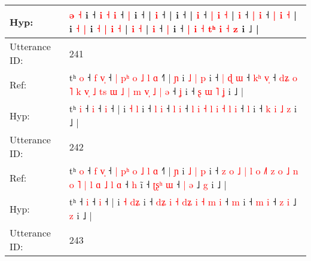 \documentclass[10pt]{article}
\DeclareRobustCommand{\hl}[1]{{\textcolor{red}{#1}}}
\begin{document}
\begin{longtable}{ll}
 \\
Hyp: & \hl{ə}\hl{ }\hl{˧} i ˧ \hl{i} \hl{˧} \hl{i} ˧\hl{}\hl{} \hl{}\hl{|} i ˧ |\hl{}\hl{} \hl{i} ˧ |\hl{}\hl{}\hl{} i ˧ |\hl{}\hl{} \hl{i} ˧ \hl{|} \hl{i} \hl{˧} |\hl{}\hl{} \hl{i} ˧ \hl{|} \hl{i} ˧ \hl{|} \hl{i} \hl{˧} |\hl{}\hl{}\hl{} i \hl{˧} \hl{}\hl{|} i \hl{˧} \hl{}\hl{|} \hl{}\hl{i} \hl{}\hl{˧} |\hl{}\hl{}\hl{} \hl{i} \hl{˧} | \hl{i} ˧ \hl{|} i ˧ \hl{|} \hl{i} \hl{˧} \hl{}\hl{t}\hl{ʰ} \hl{i} \hl{˧} \hl{}\hl{z} i ˩\hl{} |
 \\
\midrule
Utterance ID: & 241 \\
Ref: & tʰ \hl{o} ˧\hl{ }\hl{f} \hl{v}\hl{̩} ˧\hl{ }\hl{|}\hl{ }\hl{p}\hl{ʰ}\hl{ }\hl{o}\hl{ }\hl{˩}\hl{ }\hl{l} \hl{ɑ} ˧\hl{˥} |\hl{ }\hl{ɲ} i\hl{ }\hl{˩} \hl{|} \hl{p} i ˧\hl{ }\hl{|} \hl{ɖ} \hl{ɯ} ˧ \hl{k}\hl{ʰ} \hl{v}\hl{̩} ˧\hl{ }\hl{d}\hl{ʑ}\hl{ }\hl{o}\hl{ }\hl{˥}\hl{ }\hl{k}\hl{ }\hl{v}\hl{̩}\hl{ }\hl{˩}\hl{ }\hl{t}\hl{s} \hl{ɯ} \hl{˩} \hl{|} \hl{m} \hl{v}\hl{̩} \hl{˩} \hl{|} \hl{ə} ˧ \hl{ʝ} i ˧ \hl{ʂ} \hl{ɯ} \hl{˥} \hl{ʝ} i ˩ |
 \\
Hyp: & tʰ \hl{i} ˧\hl{}\hl{} \hl{}\hl{i} ˧\hl{}\hl{}\hl{}\hl{}\hl{}\hl{}\hl{}\hl{}\hl{}\hl{}\hl{} \hl{i} ˧\hl{} |\hl{}\hl{} i\hl{}\hl{} \hl{˧} \hl{l} i ˧\hl{}\hl{} \hl{l} \hl{i} ˧ \hl{}\hl{l} \hl{}\hl{i} ˧\hl{}\hl{}\hl{}\hl{}\hl{}\hl{}\hl{}\hl{}\hl{}\hl{}\hl{}\hl{}\hl{}\hl{}\hl{}\hl{}\hl{} \hl{l} \hl{i} \hl{˧} \hl{l} \hl{}\hl{i} \hl{˧} \hl{l} \hl{i} ˧ \hl{l} i ˧ \hl{k} \hl{i} \hl{˩} \hl{z} i ˩ |
 \\
\midrule
Utterance ID: & 242 \\
Ref: & tʰ\hl{ }\hl{o} ˧\hl{ }\hl{f} \hl{v}\hl{̩} ˧\hl{ }\hl{|}\hl{ }\hl{p}\hl{ʰ}\hl{ }\hl{o}\hl{ }\hl{˩}\hl{ }\hl{l} \hl{ɑ} ˧\hl{˥} |\hl{ }\hl{ɲ} i \hl{˩} \hl{|}\hl{ }\hl{p} i ˧\hl{ }\hl{z}\hl{ }\hl{o}\hl{ }\hl{˩}\hl{ }\hl{|}\hl{ }\hl{l}\hl{ }\hl{o}\hl{ }\hl{˩}\hl{˥}\hl{ }\hl{z}\hl{ }\hl{o} \hl{˩}\hl{ }\hl{n} \hl{o} \hl{˥} \hl{|}\hl{ }\hl{l} \hl{ɑ} \hl{˩} \hl{l} \hl{ɑ} ˧ \hl{h} i\hl{̃} ˧ \hl{ʈ}\hl{ʂ}\hl{ʰ} \hl{ɯ} ˧ \hl{|} \hl{ə} ˩ \hl{g} i ˩ |
 \\
Hyp: & tʰ\hl{}\hl{} ˧\hl{}\hl{} \hl{}\hl{i} ˧\hl{}\hl{}\hl{}\hl{}\hl{}\hl{}\hl{}\hl{}\hl{}\hl{}\hl{} \hl{i} ˧\hl{} |\hl{}\hl{} i \hl{˧} \hl{}\hl{d}\hl{ʑ} i ˧\hl{}\hl{}\hl{}\hl{}\hl{}\hl{}\hl{}\hl{}\hl{}\hl{}\hl{}\hl{}\hl{}\hl{}\hl{}\hl{}\hl{}\hl{}\hl{} \hl{}\hl{d}\hl{ʑ} \hl{i} \hl{˧} \hl{}\hl{d}\hl{ʑ} \hl{i} \hl{˧} \hl{m} \hl{i} ˧ \hl{m} i\hl{} ˧ \hl{}\hl{}\hl{m} \hl{i} ˧ \hl{z} \hl{i} ˩ \hl{z} i ˩ |
 \\
\midrule
Utterance ID: & 243 \\

\end{longtable}
\end{document}
